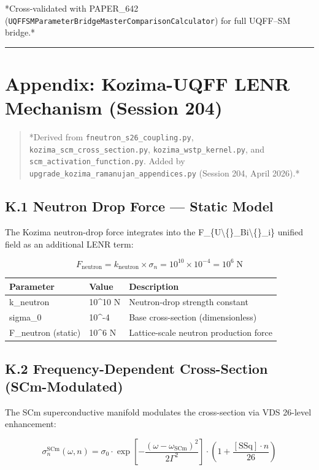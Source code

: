 \documentclass[11pt]{article}
\begin{document}
*Cross-validated with PAPER\_642 (\verb|UQFFSMParameterBridgeMasterComparisonCalculator|) for full UQFF--SM bridge.*

\noindent\rule{\textwidth}{0.4pt}

\section*{Appendix: Kozima-UQFF LENR Mechanism (Session 204)}

\begin{quote}
*Derived from \verb|fneutron_s26_coupling.py|, \verb|kozima_scm_cross_section.py|,
\verb|kozima_wstp_kernel.py|, and \verb|scm_activation_function.py|. Added by
\verb|upgrade_kozima_ramanujan_appendices.py| (Session 204, April 2026).*
\end{quote}

\subsection*{K.1 Neutron Drop Force --- Static Model}

The Kozima neutron-drop force integrates into the F\_\{U\textbackslash\{\}\_Bi\textbackslash\{\}\_i\} unified field as an additional LENR term:

$$F_{\mathrm{neutron}} = k_{\mathrm{neutron}} \times \sigma_n = 10^{10} \times 10^{-4} = 10^6 \;\text{N}$$

\begin{center}
\begin{longtable}{lll}
\toprule
Parameter & Value & Description \tabularnewline
\midrule
\endhead
k\_neutron & 10\textasciicircum{}10 N & Neutron-drop strength constant \tabularnewline
sigma\_0 & 10\textasciicircum{}-4 & Base cross-section (dimensionless) \tabularnewline
F\_neutron (static) & 10\textasciicircum{}6 N & Lattice-scale neutron production force \tabularnewline
\bottomrule
\end{longtable}
\end{center}

\subsection*{K.2 Frequency-Dependent Cross-Section (SCm-Modulated)}

The SCm superconductive manifold modulates the cross-section via VDS 26-level enhancement:

$$\sigma_n^{\mathrm{SCm}}(\omega, n) = \sigma_0 \cdot \exp\!\left[-\frac{(\omega - \omega_{\mathrm{SCm}})^2}{2\Gamma^2}\right] \cdot \left(1 + \frac{[\text{SSq}] \cdot n}{26}\right)$$
\end{document}
